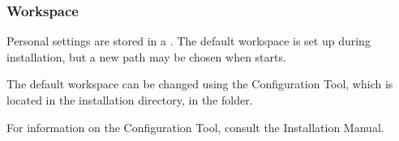 \subsubsection{Workspace}
Personal settings  are stored in a . 
The default workspace is set up
 during installation, but a new path may be chosen when \jb{} starts. 

The default workspace can be changed using the Configuration Tool, which is 
located in the \jb{}installation directory, in the  folder. 

For information on the Configuration Tool, consult the Installation Manual. 
